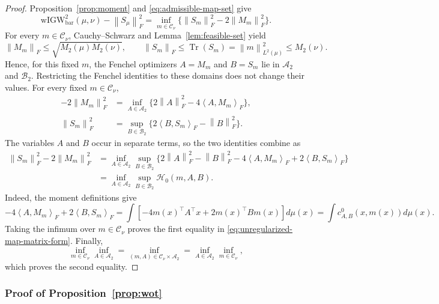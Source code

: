 \documentclass[11pt]{article}
\newcommand{\ip}[2]{\left\langle #1,#2\right\rangle}
\newcommand{\norm}[1]{\left\lVert #1\right\rVert}
\newcommand{\wIGW}{\mathrm{wIGW}_{\mathrm{bar}}}
\DeclareMathOperator{\Tr}{Tr}
\theoremstyle{plain}
\theoremstyle{definition}
\theoremstyle{remark}
\begin{document}
\begin{proof}
Proposition~\ref{prop:moment} and
\eqref{eq:admissible-map-set} give
\[
 \wIGW^2(\mu,\nu)-\norm{S_\mu}_F^2
 =\inf_{m\in\mathcal C_\nu}
   \{\norm{S_m}_F^2-2\norm{M_m}_F^2\}.
\]
For every \(m\in\mathcal C_\nu\), Cauchy--Schwarz and
Lemma~\ref{lem:feasible-set} yield
\[
 \norm{M_m}_F\le\sqrt{M_2(\mu)M_2(\nu)},\qquad
 \norm{S_m}_F\le\Tr(S_m)=\norm m_{L^2(\mu)}^2\le M_2(\nu).
\]
Hence, for this fixed $m$, the Fenchel optimizers \(A=M_m\) and \(B=S_m\)
lie in \(\mathcal A_2\) and \(\mathcal B_2\). Restricting the Fenchel
identities to these domains does not change their values. For every fixed
\(m\in\mathcal C_\nu\),
\begin{align*}
 -2\norm{M_m}_F^2
 &=\inf_{A\in\mathcal A_2}
   \{2\norm A_F^2-4\ip{A}{M_m}_F\},\\
 \norm{S_m}_F^2
 &=\sup_{B\in\mathcal B_2}
   \{2\ip{B}{S_m}_F-\norm B_F^2\}.
\end{align*}
The variables \(A\) and \(B\) occur in separate terms, so the two identities
combine as
\begin{align*}
 \norm{S_m}_F^2-2\norm{M_m}_F^2
 &=\inf_{A\in\mathcal A_2}\sup_{B\in\mathcal B_2}
 \{2\norm A_F^2-\norm B_F^2
   -4\ip{A}{M_m}_F+2\ip{B}{S_m}_F\}\\
 &=\inf_{A\in\mathcal A_2}\sup_{B\in\mathcal B_2}
   \mathcal H_0(m,A,B).
\end{align*}
Indeed, the moment definitions give
\[
 -4\ip{A}{M_m}_F+2\ip{B}{S_m}_F
 =\int\!\left[-4m(x)^\top A^\top x+2m(x)^\top Bm(x)\right]d\mu(x)
 =\int c_{A,B}^0(x,m(x))d\mu(x).
\]
Taking the infimum over \(m\in\mathcal C_\nu\) proves the first equality in
\eqref{eq:unregularized-map-matrix-form}. Finally,
\[
 \inf_{m\in\mathcal C_\nu}\inf_{A\in\mathcal A_2}
 =\inf_{(m,A)\in\mathcal C_\nu\times\mathcal A_2}
 =\inf_{A\in\mathcal A_2}\inf_{m\in\mathcal C_\nu},
\]
which proves the second equality.
\end{proof}

\subsubsection{Proof of Proposition~\ref{prop:wot}}\label{proof:8.2}
\end{document}
